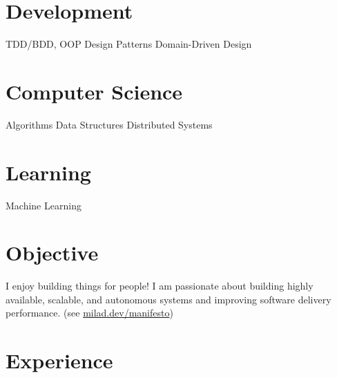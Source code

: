 \documentclass[]{cv-style}                     %
\begin{document}
\begin{aside}
\section{Development}
TDD/BDD, OOP
Design Patterns
Domain-Driven Design
%
\section{Computer Science}
Algorithms
Data Structures
Distributed Systems
%
\section{Learning}
Machine Learning
%
\end{aside}



\section{Objective}

I enjoy building things for people!
I am passionate about building highly available, scalable, and autonomous systems and improving software delivery performance.
(see \href{https://milad.dev/manifesto}{milad.dev/manifesto})



\section{Experience}
\end{document}
